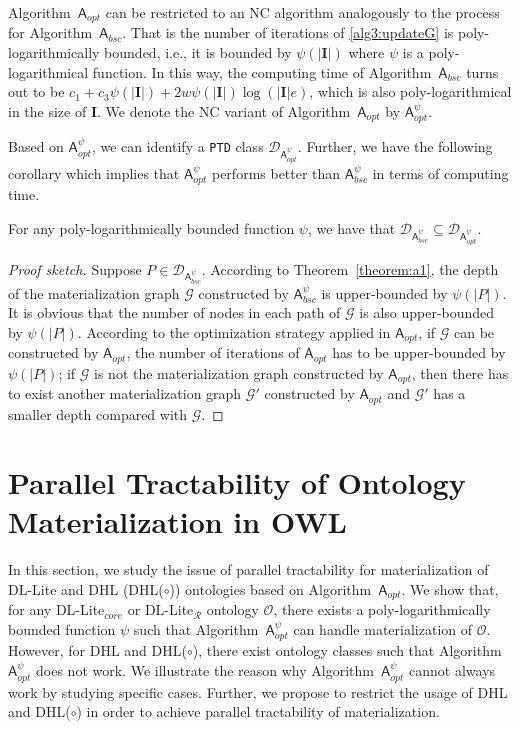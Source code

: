 \documentclass[final,1p,times]{elsarticle}
\begin{document}
Algorithm~$\mathsf{A}_{opt}$ can be restricted to an NC algorithm analogously to the process 
for Algorithm~$\mathsf{A}_{bsc}$. That is the number of iterations of \ref{alg3:updateG}
is poly-logarithmically bounded, i.e., it is bounded by $\psi(|\textbf{I}|)$
where $\psi$ is a poly-logarithmical function. In this way, the computing time of 
Algorithm~$\mathsf{A}_{bsc}$ turns out to be $c_1+c_3\psi(|\textbf{I}|)+2w\psi(|\textbf{I}|)\log(|\textbf{I}|e)$,
which is also poly-logarithmical in the size of $\textbf{I}$. We denote the 
NC variant of Algorithm~$\mathsf{A}_{opt}$ by $\mathsf{A}_{opt}^{\psi}$.

Based on $\mathsf{A}_{opt}^{\psi}$, we can identify a \texttt{PTD} class $\mathcal{D}_{\mathsf{A}_{opt}^{\psi}}$.
Further, we have the following corollary which implies that $\mathsf{A}_{opt}^{\psi}$ performs better
than $\mathsf{A}_{bsc}^{\psi}$ in terms of computing time.

\begin{corollary}
For any poly-logarithmically bounded function $\psi$,
we have that $\mathcal{D}_{\mathsf{A}_{bsc}^{\psi}}\subseteq\mathcal{D}_{\mathsf{A}_{opt}^{\psi}}$.
\end{corollary}

\begin{proof}[Proof sketch]
Suppose $P\in\mathcal{D}_{\mathsf{A}_{bsc}^{\psi}}$. According to Theorem~\ref{theorem:a1},
the depth of the materialization graph $\mathcal{G}$ constructed by $\mathsf{A}_{bsc}^{\psi}$ is upper-bounded by $\psi(|P|)$.
It is obvious that the number of nodes in each path of $\mathcal{G}$ is also upper-bounded by $\psi(|P|)$.
According to the optimization strategy applied in $\mathsf{A}_{opt}$, if $\mathcal{G}$ can be constructed
by $\mathsf{A}_{opt}$, the number of iterations of $\mathsf{A}_{opt}$ has to be upper-bounded by $\psi(|P|)$;
if $\mathcal{G}$ is not the materialization graph constructed
by $\mathsf{A}_{opt}$, then there has to exist another materialization graph $\mathcal{G}'$ constructed by $\mathsf{A}_{opt}$
and $\mathcal{G}'$ has a smaller depth compared with $\mathcal{G}$.
\end{proof}


\section{Parallel Tractability of Ontology Materialization in OWL}
\label{sec:ptonto}

In this section, we study the issue of parallel tractability
for materialization of DL-Lite and DHL (DHL($\circ$)) ontologies
based on Algorithm~$\mathsf{A}_{opt}$.
We show that, for any DL-Lite$_{core}$ or DL-Lite$_\mathcal{R}$ ontology $\mathcal{O}$,
there exists a poly-logarithmically bounded function $\psi$
such that Algorithm~$\mathsf{A}_{opt}^{\psi}$ can handle materialization of $\mathcal{O}$.
However, for DHL and DHL($\circ$), there exist ontology classes such that Algorithm~$\mathsf{A}_{opt}^\psi$
does not work. We illustrate the reason why Algorithm~$\mathsf{A}_{opt}^\psi$ cannot always
work by studying specific cases.
Further, we propose to restrict the usage of DHL and DHL($\circ$) in order to achieve parallel tractability
of materialization.
\end{document}
